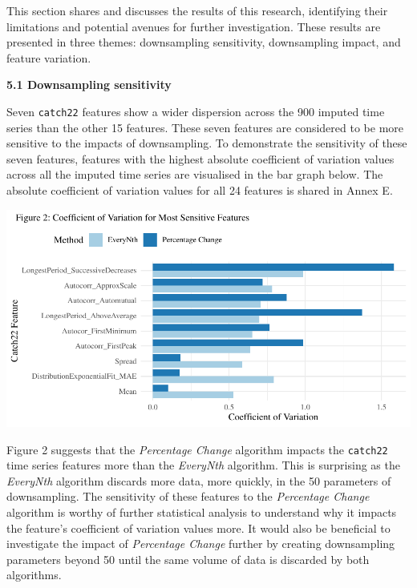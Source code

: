 \documentclass{article}
\begin{document}
\vspace{-0.4cm}

This section shares and discusses the results of this research,
identifying their limitations and potential avenues for further
investigation. These results are presented in three themes: downsampling
sensitivity, downsampling impact, and feature variation.

\newpage

\textbf{5.1 Downsampling sensitivity}

Seven \texttt{catch22} features show a wider dispersion across the 900
imputed time series than the other 15 features. These seven features are
considered to be more sensitive to the impacts of downsampling. To
demonstrate the sensitivity of these seven features, features with the
highest absolute coefficient of variation values across all the imputed
time series are visualised in the bar graph below. The absolute
coefficient of variation values for all 24 features is shared in Annex
E.

\includegraphics{210431461_CSC8639_Dissertation_files/figure-latex/CombinedSensitivity-1.pdf}

Figure 2 suggests that the \emph{Percentage Change} algorithm impacts
the \texttt{catch22} time series features more than the \emph{EveryNth}
algorithm. This is surprising as the \emph{EveryNth} algorithm discards
more data, more quickly, in the 50 parameters of downsampling. The
sensitivity of these features to the \emph{Percentage Change} algorithm
is worthy of further statistical analysis to understand why it impacts
the feature's coefficient of variation values more. It would also be
beneficial to investigate the impact of \emph{Percentage Change} further
by creating downsampling parameters beyond 50 until the same volume of
data is discarded by both algorithms.
\end{document}
